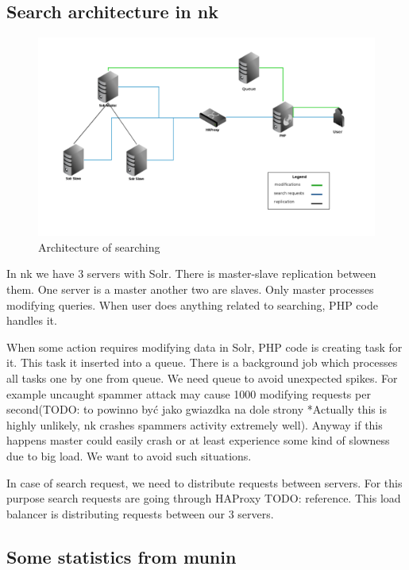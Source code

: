 \documentclass[10pt,a4paper]{article}
\newcommand{\todo}[1]{\noindent\colorbox{myRed}{TODO: #1}}
\begin{document}
\subsection{Search architecture in nk}

\begin{figure}
\centering
  \includegraphics[width=12cm]{architektura_wyszukiwania}
  \caption{Architecture of searching}
  \label{fig:architektura_wyszukiwania}
\end{figure}

In nk we have 3 servers with Solr. There is master-slave replication between them. One server is a master another two are slaves. Only master processes modifying queries. When user does anything related to searching, PHP code handles it.

When some action requires modifying data in Solr, PHP code is creating task for it. This task it inserted into a queue. There is a background job which processes all tasks one by one from queue. We need queue to avoid unexpected spikes. For example uncaught spammer attack may cause 1000 modifying requests per second(\todo{to powinno być jako gwiazdka na dole strony} *Actually this is highly unlikely, nk crashes spammers activity extremely well). Anyway if this happens master could easily crash or at least experience some kind of slowness due to big load. We want to avoid such situations. 

In case of search request, we need to distribute requests between servers. For this purpose search requests are going through HAProxy \todo{reference}. This load balancer is distributing requests between our 3 servers.

\subsection{Some statistics from munin}
\end{document}
